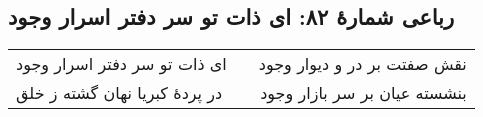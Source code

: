 \begin{center}
\section*{رباعی شمارهٔ ۸۲: ای ذات تو سر دفتر اسرار وجود}
\label{sec:082}
\begin{longtable}{l p{0.5cm} r}
ای ذات تو سر دفتر اسرار وجود
&&
نقش صفتت بر در و دیوار وجود
\\
در پردهٔ کبریا نهان گشته ز خلق
&&
بنشسته عیان بر سر بازار وجود
\\
\end{longtable}
\end{center}
